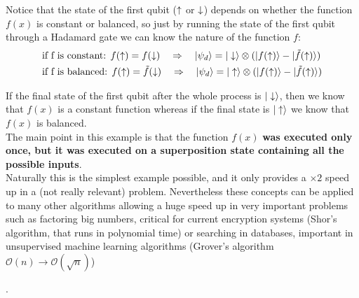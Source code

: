 Notice that the state of the first qubit ($\uparrow$ or $\downarrow$) depends on whether the function $f(x)$ is constant or balanced, so just by running the state of the first qubit through a Hadamard gate we can know the nature of the function $f$:
\begin{equation}
  \begin{split}
    &\text{if f is constant:   }f(\uparrow)=f(\downarrow)\quad\Rightarrow\quad
    |\psi_d\rangle= |\downarrow\rangle\otimes(|f(\uparrow)\rangle-|\tilde{f}(\uparrow)\rangle)\\
    &\text{if f is balanced:   } f(\uparrow)=\tilde{f}(\downarrow)\quad\Rightarrow\quad
    |\psi_d\rangle= |\uparrow\rangle\otimes(|f(\uparrow)\rangle-|\tilde{f}(\uparrow)\rangle)
  \end{split}
\end{equation}

If the final state of the first qubit after the whole process is $|\downarrow\rangle$, then we know that $f(x)$ is a constant function whereas if the final state is $|\uparrow\rangle$ we know that $f(x)$ is balanced.\\

The main point in this example is that the function $f(x)$ \textbf{was executed only once, but it was executed on a superposition state containing all the possible inputs}.\\

Naturally this is the simplest example possible, and it only provides a $\times2$ speed up in a (not really relevant) problem. Nevertheless these concepts can be applied to many other algorithms allowing a huge speed up in very important problems such as factoring big numbers, critical for current encryption systems (Shor's algorithm, that runs in polynomial time) or searching in databases, important in unsupervised machine learning algorithms (Grover's algorithm $\mathcal{O}(n)\rightarrow\mathcal{O}(\sqrt{n})$)

.

